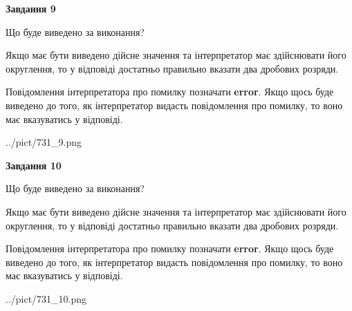 \documentclass[12pt, ukrainian]{article}
\begin{document}
{\begin {Large}
{\begin {center}\textbf{Завдання 9}\end {center}}\par
Що буде виведено за виконання? \par

Якщо має бути виведено дійсне значення та інтерпретатор має здійснювати його округлення, 
то у відповіді достатньо правильно вказати два дробових розряди.

Повідомлення інтерпретатора про помилку позначати \textbf{error}.
Якщо щось буде виведено до того, як інтерпретатор видасть повідомлення про помилку, 
то воно має вказуватись у відповіді. \par

\begin{center}
	{../pict/731_9.png}
\end{center}
\newpage

{\begin {center}\textbf{Завдання 10}\end {center}}\par
Що буде виведено за виконання? \par

Якщо має бути виведено дійсне значення та інтерпретатор має здійснювати його округлення, 
то у відповіді достатньо правильно вказати два дробових розряди.

Повідомлення інтерпретатора про помилку позначати \textbf{error}.
Якщо щось буде виведено до того, як інтерпретатор видасть повідомлення про помилку, 
то воно має вказуватись у відповіді. \par

\begin{center}
	{../pict/731_10.png}
\end{center}
\newpage

\end {Large}}
\end{document}
